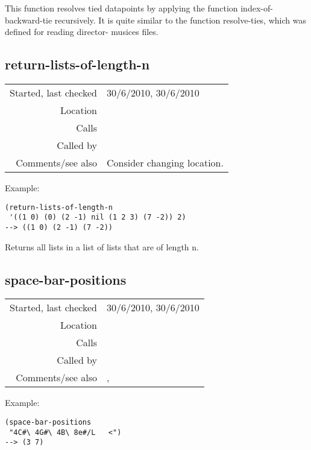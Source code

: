 \noindent This function resolves tied datapoints by
applying the function index-of-backward-tie
recursively. It is quite similar to the function
resolve-ties, which was defined for reading director-
musices files.


\subsection*{return-lists-of-length-n}\label{fun:return-lists-of-length-n}

\vspace{0.3cm}
\begin{tabular}{r|p{8cm}}
Started, last checked & 30/6/2010, 30/6/2010 \\
Location & \nameref{sec:kern} \\
Calls & \\
Called by & \nameref{fun:parse-kern-row} \\
Comments/see also & Consider changing location.
\end{tabular}

\vspace{0.5cm}
\noindent Example:
\begin{verbatim}
(return-lists-of-length-n
 '((1 0) (0) (2 -1) nil (1 2 3) (7 -2)) 2)
--> ((1 0) (2 -1) (7 -2))
\end{verbatim}

\noindent Returns all lists in a list of lists that
are of length n.


\subsection*{space-bar-positions}\label{fun:space-bar-positions}

\vspace{0.3cm}
\begin{tabular}{r|p{8cm}}
Started, last checked & 30/6/2010, 30/6/2010 \\
Location & \nameref{sec:kern} \\
Calls & \\
Called by & \nameref{fun:space-bar-separated-string2list} \\
Comments/see also & \nameref{fun:comma-positions}, \nameref{fun:tab-positions}
\end{tabular}

\vspace{0.5cm}
\noindent Example:
\begin{Verbatim}[showtabs=true]
(space-bar-positions
 "4C#\ 4G#\ 4B\	8e#/L	<")
--> (3 7)
\end{Verbatim}

